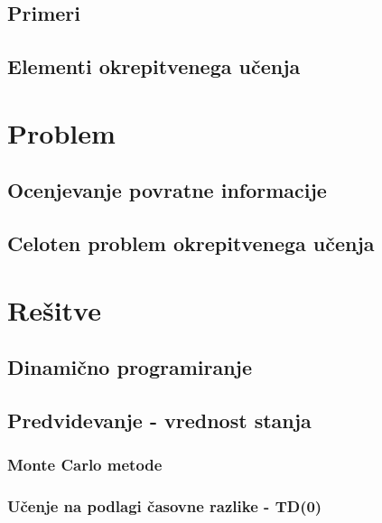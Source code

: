\documentclass[a4paper, oneside, 12pt]{article}
\begin{document}



\subsection{Primeri}
\subsection{Elementi okrepitvenega učenja}
\newpage

\section{Problem}
\label{section:problem}
\subsection{Ocenjevanje povratne informacije}
\subsection{Celoten problem okrepitvenega učenja}
\newpage

\section{Rešitve}
\subsection{Dinamično programiranje}
\subsection{Predvidevanje - vrednost stanja}
\subsubsection{Monte Carlo metode}
\subsubsection{Učenje na podlagi časovne razlike - TD(0)}
\end{document}
